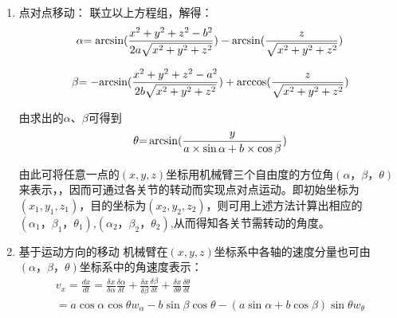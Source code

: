 \begin{enumerate}
\item 点对点移动：
联立以上方程组，解得：
\begin{displaymath}
\alpha {\rm{ = arcsin(}}\frac{{{x^2} + {y^2} + {z^2} - {b^2}}}{{2a\sqrt {{x^2} + {y^2} + {z^2}} }}) - {\rm{arcsin(}}\frac{z}{{\sqrt {{x^2} + {y^2} + {z^2}} }})
\end{displaymath}

\begin{displaymath}
\beta {\rm{ =  - arcsin(}}\frac{{{x^2} + {y^2} + {z^2} - {a^2}}}{{2b\sqrt {{x^2} + {y^2} + {z^2}} }}) + {\rm{arccos(}}\frac{z}{{\sqrt {{x^2} + {y^2} + {z^2}} }})
\end{displaymath}

由求出的$\alpha$、$\beta$可得到
\begin{equation}
\theta {\rm{ = }}\arcsin (\frac{y}{{a \times \sin \alpha  + b \times \cos \beta }})
\end{equation}

由此可将任意一点的$(x,y,z)$坐标用机械臂三个自由度的方位角$(\alpha，\beta，\theta)$来表示，，因而可通过各关节的转动而实现点对点运动。即初始坐标为$(x_1,y_1,z_1)$，目的坐标为$(x_2,y_2,z_2)$，则可用上述方法计算出相应的$(\alpha_1，\beta_1，\theta_1)$,$(\alpha_2，\beta_2，\theta_2)$,从而得知各关节需转动的角度。

\item 基于运动方向的移动
机械臂在$(x,y,z)$坐标系中各轴的速度分量也可由$(\alpha，\beta，\theta)$坐标系中的角速度表示：
\begin{displaymath}
\begin{array}{l}
{v_x} = \frac{{dx}}{{dt}} = \frac{{\delta x}}{{\delta \alpha }}\frac{{\delta \alpha }}{{\delta t}} + \frac{{\delta x}}{{\delta \beta }}\frac{{\delta \beta }}{{\delta t}} + \frac{{\delta x}}{{\delta \theta }}\frac{{\delta \theta }}{{\delta t}} \\= a\cos \alpha \cos \theta {w_\alpha } - b\sin \beta \cos \theta  - (a\sin \alpha  + b\cos \beta )\sin \theta {w_\theta }\\


\end{array}
\end{displaymath}
\end{enumerate}
